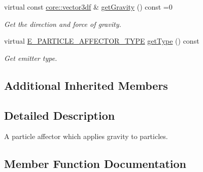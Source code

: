\begin{DoxyCompactItemize}
\mbox{\label{classirr_1_1scene_1_1IParticleGravityAffector_ac6368c49867f62a4e873dfd6142abec9}} 
virtual const \hyperlink{namespaceirr_1_1core_ae6e2b2a6c552833ebbd5b7463d03586b}{core\+::vector3df} \& \hyperlink{classirr_1_1scene_1_1IParticleGravityAffector_ac6368c49867f62a4e873dfd6142abec9}{get\+Gravity} () const =0
\begin{DoxyCompactList}\small\item\em Get the direction and force of gravity. \end{DoxyCompactList}\item 
\mbox{\label{classirr_1_1scene_1_1IParticleGravityAffector_a60a002206e1fa758137f92b8dc390b7c}} 
virtual \hyperlink{namespaceirr_1_1scene_a34c0f9475cfcbda8b50ad816a046010b}{E\+\_\+\+P\+A\+R\+T\+I\+C\+L\+E\+\_\+\+A\+F\+F\+E\+C\+T\+O\+R\+\_\+\+T\+Y\+PE} \hyperlink{classirr_1_1scene_1_1IParticleGravityAffector_a60a002206e1fa758137f92b8dc390b7c}{get\+Type} () const
\begin{DoxyCompactList}\small\item\em Get emitter type. \end{DoxyCompactList}\end{DoxyCompactItemize}
\subsection*{Additional Inherited Members}


\subsection{Detailed Description}
A particle affector which applies gravity to particles. 

\subsection{Member Function Documentation}
\mbox{\label{classirr_1_1scene_1_1IParticleGravityAffector_a3910d872c740e678373cecbd5523ad38}} 
